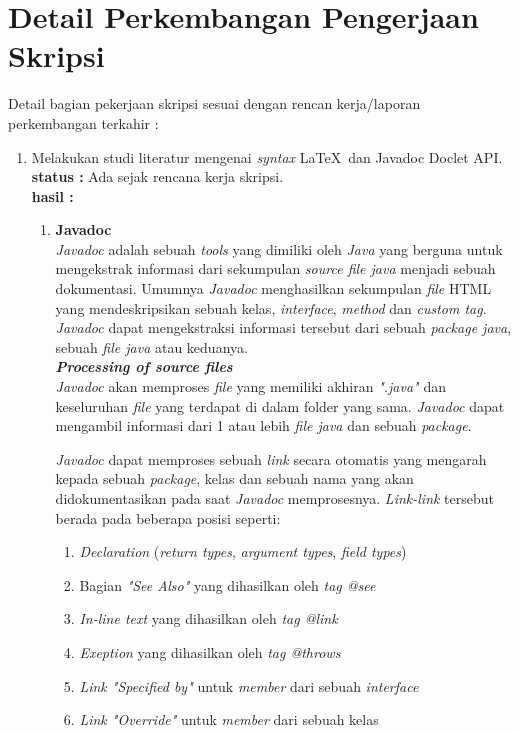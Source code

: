 \documentclass[a4paper,twoside]{article}
\begin{document}
\section{Detail Perkembangan Pengerjaan Skripsi}
Detail bagian pekerjaan skripsi sesuai dengan rencan kerja/laporan perkembangan terkahir :
	\begin{enumerate}
		\item Melakukan studi literatur mengenai {\it syntax} \LaTeX\ dan Javadoc Doclet API.\\
		{\bf status :} Ada sejak rencana kerja skripsi.\\
		{\bf hasil :} 
		\begin{enumerate}
			\item \textbf{Javadoc}\\
			{\it Javadoc} adalah sebuah {\it tools} yang dimiliki oleh {\it Java} yang berguna untuk mengekstrak informasi dari sekumpulan {\it source file java} menjadi sebuah dokumentasi. Umumnya {\it Javadoc} menghasilkan sekumpulan {\it file} HTML yang mendeskripsikan sebuah kelas, {\it interface}, {\it method} dan {\it custom tag}. {\it Javadoc} dapat mengekstraksi informasi tersebut dari sebuah {\it package java}, sebuah {\it file java} atau keduanya.\\

\textbf{\textit{Processing of source files}}\\
{\it Javadoc} akan memproses {\it file} yang memiliki akhiran {\it ".java"} dan keseluruhan {\it file} yang terdapat di dalam folder yang sama. {\it Javadoc} dapat mengambil informasi dari 1 atau lebih {\it file java} dan sebuah {\it package}.

{\it Javadoc} dapat memproses sebuah {\it link} secara otomatis yang mengarah kepada sebuah {\it package}, kelas dan sebuah nama yang akan didokumentasikan pada saat {\it Javadoc} memprosesnya. {\it Link-link} tersebut berada pada beberapa posisi seperti:
\begin{enumerate}
	\item {\it Declaration} ({\it return types}, {\it argument types}, {\it field types})
	\item Bagian {\it "See Also"} yang dihasilkan oleh {\it tag @see}
	\item {\it In-line text} yang dihasilkan oleh {\it tag {@link}}
	\item {\it Exeption} yang dihasilkan oleh {\it tag @throws}
	\item {\it Link "Specified by"} untuk {\it member} dari sebuah {\it interface}
	\item {\it Link "Override"} untuk {\it member} dari sebuah kelas
\end{enumerate}


\end{enumerate}
\end{enumerate}
\end{document}
